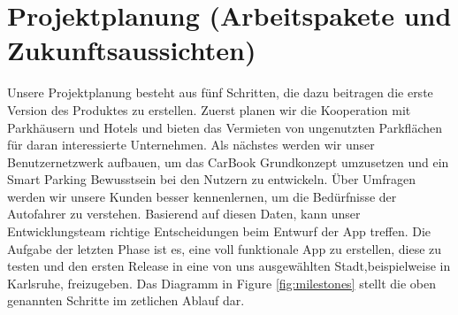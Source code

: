 \documentclass[12pt,ngerman, fleqn]{book} %
\begin{document}
\section{Projektplanung (Arbeitspakete und Zukunftsaussichten)}
Unsere Projektplanung besteht aus fünf Schritten, die dazu beitragen die erste Version des Produktes zu erstellen. Zuerst planen wir die Kooperation mit Parkhäusern und Hotels und bieten das Vermieten von ungenutzten Parkflächen für daran interessierte Unternehmen. Als nächstes werden wir unser Benutzernetzwerk aufbauen, um das CarBook Grundkonzept umzusetzen und ein Smart Parking Bewusstsein bei den Nutzern zu entwickeln. Über Umfragen werden wir unsere Kunden besser kennenlernen, um die Bedürfnisse der Autofahrer zu verstehen. Basierend auf diesen Daten, kann unser Entwicklungsteam richtige Entscheidungen beim Entwurf der App treffen. Die Aufgabe der letzten Phase ist es, eine voll funktionale App zu erstellen, diese zu testen und den ersten Release in eine von uns ausgewählten Stadt,beispielweise in Karlsruhe, freizugeben. Das Diagramm in Figure \ref{fig:milestones} stellt die oben genannten Schritte im zetlichen Ablauf dar.\linebreak \\[5]





\end{document}
